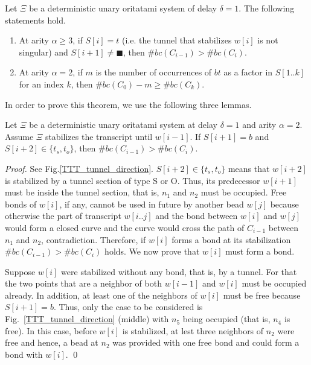 

\begin{theorem}
\label{TTT}
Let $\Xi$ be a deterministic unary oritatami system of delay $\delta = 1$. The following statements hold.
\begin{enumerate}
\item At arity $\alpha \geq 3$, if $S[i] = t$ (i.e. the tunnel that stabilizes $w[i]$ is not singular) and $S[i+1] \neq \blacksquare$, then $\#bc(C_{i-1}) > \#bc(C_i)$.
\item At arity $\alpha = 2$, if $m$ is the number of occurrences of $bt$ as a factor in $S[1..k]$ for an index $k$, then $\#bc(C_{0}) - m \geq \#bc(C_{k})$.
\end{enumerate}
\end{theorem}

In order to prove this theorem, we use the following three lemmas.


\begin{lemma}
\label{TTT_entrance_Tab}
Let $\Xi$ be a deterministic unary oritatami system at delay $\delta = 1$ and arity $\alpha =2$. 
Assume $\Xi$ stabilizes the transcript until $w[i-1]$. If $S[i+1] = b$ and $S[i+2] \in \{ t_s, t_o \} $, then $\#bc(C_{i-1}) > \#bc(C_{i})$.
\end{lemma}

\begin{proof}%
See Fig.\ref{TTT_tunnel_direction}.
$S[i+2] \in \{ t_s, t_o \} $ means that $w[i+2]$ is stabilized by a tunnel section of type S or O.
Thus,  its predecessor $w[i+1]$ must be inside the tunnel section, that is, $n_1$ and $n_2$ must be occupied.
Free bonds of $w[i]$, if any, cannot be used in future by another bead $w[j]$ because otherwise the part of transcript $w[i..j]$ and the bond between $w[i]$ and $w[j]$ would form a closed curve and the curve would cross the path of $C_{i-1}$ between $n_1$ and $n_2$, contradiction.
Therefore, if $w[i]$ forms a bond at its stabilization $\#bc(C_{i-1}) > \#bc(C_{i})$ holds.
We now prove that $w[i]$ must form a bond.


Suppose $w[i]$ were stabilized without any bond, that is, by a tunnel.
For that the two points that are a neighbor of both $w[i-1]$ and $w[i]$ must be occupied already.
In addition, at least one of the neighbors of $w[i]$ must be free because $S[i+1] = b$.
Thus, only the case to be considered is Fig.~\ref{TTT_tunnel_direction} (middle) with $n_5$ being occupied (that is, $n_4$ is free).
In this case, before $w[i]$ is stabilized, at lest three neighbors of $n_2$ were free and hence, a bead at $n_2$ was provided with one free bond and could form a bond with $w[i]$. \qed

\end{proof}

